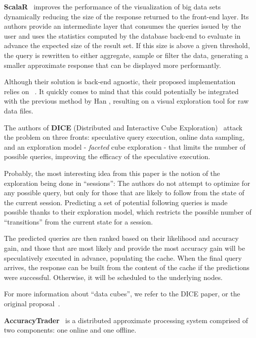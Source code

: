 \medskip

\textbf{ScalaR}~\cite{Battle2013} improves the performance of the visualization 
of big data sets dynamically reducing the size of the response returned to the 
front-end layer. Its authors provide an intermediate layer that consumes the 
queries issued by the user and uses the statistics computed by the database 
back-end to evaluate in advance the expected size of the result set. If this 
size is above a given threshold, the query is rewritten to either aggregate, 
sample or filter the data, generating a smaller approximate response that can be 
displayed more performantly.

Although their solution is back-end agnostic, their proposed implementation 
relies on \scidb~\cite{Stonebraker2011}. It quickly comes to mind that this could 
potentially be integrated with the previous method by Han \etal\cite{Han2017}, 
resulting on a visual exploration tool for raw data files.

\medskip

The authors of \textbf{DICE} (Distributed and Interactive Cube 
Exploration)~\cite{Kamat2014} attack the problem on three fronts: speculative 
query execution, online data sampling, and an exploration model - 
\textit{faceted} cube exploration - that limits the number of possible queries, 
improving the efficacy of the speculative execution.

Probably, the most interesting idea from this paper is the notion of 
the exploration being done in ``sessions'': The authors do not attempt to 
optimize for any possible query, but only for those that are likely to follow 
from the state of the current session. Predicting a set of potential following 
queries is made possible thanks to their exploration model, which
restricts the possible number of ``transitions'' from the current state 
for a session.

The predicted queries are then ranked based on their likelihood and 
accuracy gain, and those that are most likely and provide the most accuracy gain 
will be speculatively executed in advance, populating the cache. When the final 
query arrives, the response can be built from the content of the cache if the 
predictions were successful. Otherwise, it will be scheduled to the underlying 
nodes.

For more information about ``data cubes'', we refer to the DICE paper,
or the original proposal~\cite{Gray1997}.

\medskip

\textbf{AccuracyTrader}~\cite{Han2016} is a distributed approximate processing 
system comprised of two components: one online and one offline.

